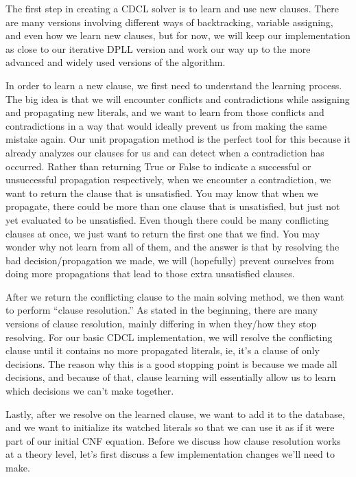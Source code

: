 \documentclass[../main.tex]{subfiles}
\begin{document}
The first step in creating a CDCL solver is to learn and use new clauses. There are 
many versions involving different ways of backtracking, variable assigning, and even 
how we learn new clauses, but for now, we will keep our implementation as close to 
our iterative DPLL version and work our way up to the more advanced and widely used 
versions of the algorithm. 

In order to learn a new clause, we first need to understand the learning process. 
The big idea is that we will encounter conflicts and contradictions while assigning 
and propagating new literals, and we want to learn from those conflicts and contradictions 
in a way that would ideally prevent us from making the same mistake again. Our unit 
propagation method is the perfect tool for this because it already analyzes our clauses 
for us and can detect when a contradiction has occurred. Rather than returning True or 
False to indicate a successful or unsuccessful propagation respectively, when we 
encounter a contradiction, we want to return the clause that is unsatisfied. You may know that
when we propagate, there could be more than one clause that is unsatisfied, but just not 
yet evaluated to be unsatisfied. Even though there could be many conflicting clauses at
once, we just want to return the first one that we find. You may wonder why not learn from 
all of them, and the answer is that by resolving the bad decision/propagation we made, 
we will (hopefully) prevent ourselves from doing more propagations that lead to those 
extra unsatisfied clauses.

After we return the conflicting clause to the main solving method, we then want to 
perform ``clause resolution.'' As stated in the beginning, there are many versions of 
clause resolution, mainly differing in when they/how they stop resolving. For our basic 
CDCL implementation, we will resolve the conflicting clause until it contains no more 
propagated literals, ie, it's a clause of only decisions. The reason why this is a good 
stopping point is because we made all decisions, and because of that, clause learning 
will essentially allow us to learn which decisions we can't make together. 

Lastly, after we resolve on the learned clause, we want to add it to the database,
and we want to initialize its watched literals so that we can use it as if it were 
part of our initial CNF equation. Before we discuss how clause resolution works at 
a theory level, let's first discuss a few implementation changes we'll need to make.
\end{document}
